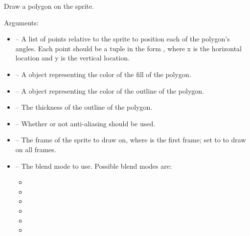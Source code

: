 \documentclass[letterpaper,10pt,english]{sphinxmanual}
\begin{document}
\begin{fulllineitems}
\label{gfx:sge.gfx.Sprite.draw_polygon}
Draw a polygon on the sprite.

Arguments:
\begin{itemize}
\item {} 
 -- A list of points relative to the sprite to
position each of the polygon's angles.  Each point should be a
tuple in the form , where x is the horizontal
location and y is the vertical location.

\item {} 
 -- A {\hyperref[gfx:sge.gfx.Color]{\emph{}}} object representing the
color of the fill of the polygon.

\item {} 
 -- A {\hyperref[gfx:sge.gfx.Color]{\emph{}}} object representing
the color of the outline of the polygon.

\item {} 
 -- The thickness of the outline of the
polygon.

\item {} 
 -- Whether or not anti-aliasing should be used.

\item {} 
 -- The frame of the sprite to draw on, where 
is the first frame; set to  to draw on all
frames.

\item {} 
 -- The blend mode to use.  Possible blend modes
are:
\begin{itemize}
\item {} 

\item {} 

\item {} 

\item {} 

\item {} 

\item {} 


\end{itemize}
\end{itemize}
\end{fulllineitems}
\end{document}
